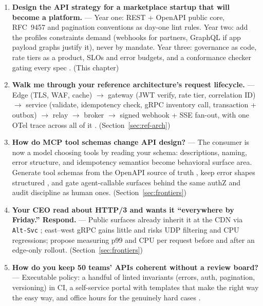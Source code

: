 \begin{enumerate}[label=\textbf{Q\arabic*.}, leftmargin=3em, start=25]
  \item \textbf{Design the API strategy for a marketplace startup that will
        become a platform.} --- Year one: REST + OpenAPI public core,
        RFC~9457 and pagination conventions as day-one lint rules. Year two:
        add the profiles constraints demand (webhooks for partners, GraphQL
        if app payload graphs justify it), never by mandate. Year three:
        governance as code, rate tiers as a product, SLOs and error budgets,
        and a conformance checker gating every spec
        \cite{gehl2021apidesign}. (This chapter)
  \item \textbf{Walk me through your reference architecture's request
        lifecycle.} --- Edge (TLS, WAF, cache) $\rightarrow$ gateway (JWT
        verify, rate tier, correlation ID) $\rightarrow$ service (validate,
        idempotency check, gRPC inventory call, transaction + outbox)
        $\rightarrow$ relay $\rightarrow$ broker $\rightarrow$ signed webhook
        + SSE fan-out, with one OTel trace across all of it
        \cite{opentelemetrydocs}. (Section~\ref{sec:ref-arch})
  \item \textbf{How do MCP tool schemas change API design?} --- The consumer
        is now a model choosing tools by reading your schema: descriptions,
        naming, error structure, and idempotency semantics become behavioral
        surface area. Generate tool schemas from the OpenAPI source of truth
        \cite{openapi31,jsonschemadocs}, keep error shapes structured
        \cite{rfc9457}, and gate agent-callable surfaces behind the same
        authZ and audit discipline as human ones. (Section~\ref{sec:frontiers})
  \item \textbf{Your CEO read about HTTP/3 and wants it ``everywhere by
        Friday.'' Respond.} --- Public surfaces already inherit it at the CDN
        via \texttt{Alt-Svc} \cite{rfc9114}; east--west gRPC gains little and
        risks UDP filtering and CPU regressions; propose measuring p99 and
        CPU per request before and after an edge-only rollout.
        (Section~\ref{sec:frontiers})
  \item \textbf{How do you keep 50 teams' APIs coherent without a review
        board?} --- Executable policy: a handful of linted invariants
        (errors, auth, pagination, versioning) in CI, a self-service portal
        with templates that make the right way the easy way, and office
        hours for the genuinely hard cases \cite{openapi31,asyncapi}.

\end{enumerate}
